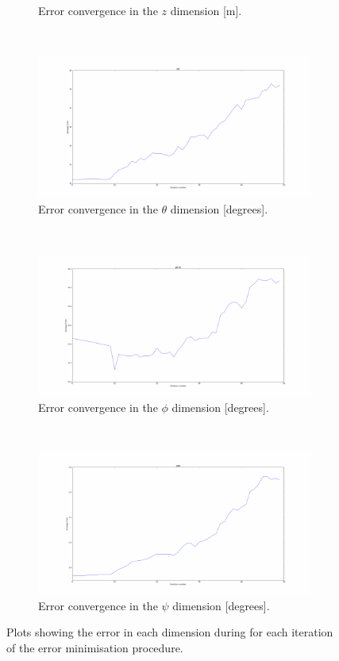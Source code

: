 \begin{figure}
\begin{subfigure}{0.45\textwidth}
    \caption{Error convergence in the $z$ dimension [m].}
\label{fig:err-convergence-z}
  \end{subfigure}
~
  \begin{subfigure}{0.45\textwidth}
    \includegraphics[width=\textwidth]{figures/chapter3/err_roll.pdf}
    \caption{Error convergence in the $\theta$ dimension [degrees].}
\label{fig:err-convergence-roll}
  \end{subfigure}
~
  \begin{subfigure}{0.45\textwidth}
    \includegraphics[width=\textwidth]{figures/chapter3/err_pitch.pdf}
    \caption{Error convergence in the $\phi$ dimension [degrees].}
\label{fig:err-convergence-pitch}
  \end{subfigure}
~
  \begin{subfigure}{0.45\textwidth}
    \includegraphics[width=\textwidth]{figures/chapter3/err_yaw.pdf}
    \caption{Error convergence in the $\psi$ dimension [degrees].}
\label{fig:err-convergence-psi}
  \end{subfigure}
  \caption{Plots showing the error in each dimension during for each iteration of the error minimisation procedure.}
  \label{fig:err-convergence}
\end{figure}

